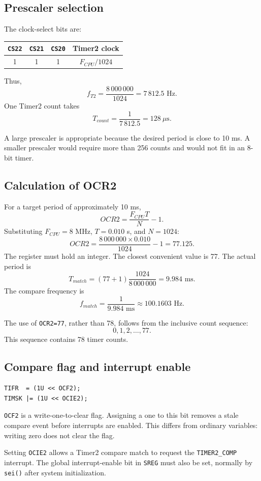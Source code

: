 \documentclass[11pt,a4paper]{article}
\begin{document}
\subsection{Prescaler selection}
The clock-select bits are:
\begin{center}
\begin{tabular}{cccc}
\toprule
\texttt{CS22} & \texttt{CS21} & \texttt{CS20} & Timer2 clock \\
\midrule
1 & 1 & 1 & \(F_{CPU}/1024\) \\
\bottomrule
\end{tabular}
\end{center}
Thus,
\[
f_{T2}=\frac{8\,000\,000}{1024}=7\,812.5\text{ Hz}.
\]
One Timer2 count takes
\[
T_{count}=\frac{1}{7\,812.5}=128\ \mu\text{s}.
\]

A large prescaler is appropriate because the desired period is close to 10 ms. A smaller prescaler would require more than 256 counts and would not fit in an 8-bit timer.

\subsection{Calculation of OCR2}
For a target period of approximately 10 ms,
\[
OCR2=\frac{F_{CPU}T}{N}-1.
\]
Substituting \(F_{CPU}=8\) MHz, \(T=0.010\) s, and \(N=1024\):
\[
OCR2=\frac{8\,000\,000\times0.010}{1024}-1
=77.125.
\]
The register must hold an integer. The closest convenient value is 77. The actual period is
\[
T_{match}=(77+1)\frac{1024}{8\,000\,000}
=9.984\text{ ms}.
\]
The compare frequency is
\[
f_{match}=\frac{1}{9.984\text{ ms}}
\approx100.1603\text{ Hz}.
\]

The use of \texttt{OCR2=77}, rather than 78, follows from the inclusive count sequence:
\[
0,1,2,\ldots,77.
\]
This sequence contains 78 timer counts.

\subsection{Compare flag and interrupt enable}
\begin{lstlisting}[style=cstyle]
TIFR  = (1U << OCF2);
TIMSK |= (1U << OCIE2);
\end{lstlisting}
\texttt{OCF2} is a write-one-to-clear flag. Assigning a one to this bit removes a stale compare event before interrupts are enabled. This differs from ordinary variables: writing zero does not clear the flag.

Setting \texttt{OCIE2} allows a Timer2 compare match to request the \texttt{TIMER2\_COMP} interrupt. The global interrupt-enable bit in \texttt{SREG} must also be set, normally by \texttt{sei()} after system initialization.
\end{document}
